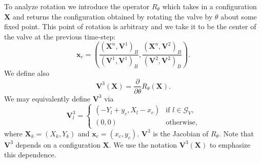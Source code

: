 \documentclass[preprint,12pt]{elsarticle}
\begin{document}
To analyze rotation we introduce the operator $R_{\theta}$ which takes in a configuration $\mathbf{X}$ and returns the configuration obtained by rotating the valve by $\theta$ about some fixed point. This point of rotation is arbitrary and we take it to be the center of the valve at the previous time-step:
\begin{equation}
\mathbf{x}_c = 
\left(\frac{( \mathbf{X}^n, \mathbf{V}^1)_B}{( \mathbf{V}^1, \mathbf{V}^1)_B}, 
\frac{( \mathbf{X}^n, \mathbf{V}^2)_B}{( \mathbf{V}^2, \mathbf{V}^2)_B}\right).
\label{eqn:Center}
\end{equation}
We define also
\begin{equation}
\mathbf{V}^3(\mathbf{X}) = \frac{\partial}{\partial \theta}R_\theta(\mathbf{X}). 
\label{eqn:e3}
\end{equation}
We may equivalently define $\mathbf{V}^3$ via
\begin{equation}
\mathbf{V}^3_l =
\begin{cases}
(-Y_l+y_c,X_l-x_c)& \textrm{if } l\in \mathcal{G}_V, \\
(0,0)& \textrm{otherwise},
\end{cases}
\end{equation}
where $\mathbf{X}_k=(X_k,Y_k)$ and $\mathbf{x}_c = (x_c,y_c)$. $\mathbf{V}^3$ is the Jacobian of $R_\theta$. Note that $\mathbf{V}^3$ depends on a configuration $\mathbf{X}$. We use the
notation $\mathbf{V}^3(\mathbf{X})$ to emphasize this dependence.
\end{document}
